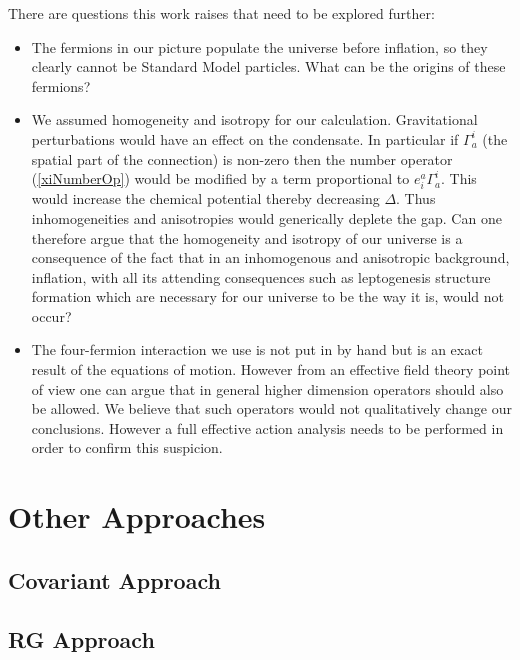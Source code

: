 \begin{doublespace}
There are questions this work raises that need to be explored further:
\begin{itemize}
    \item The fermions in our picture populate the universe before inflation, so they clearly
    cannot be Standard Model particles. What can be the origins of these fermions?
    \item We assumed homogeneity and isotropy for our calculation. Gravitational perturbations
    would have an effect on the condensate. In particular if
$\Gamma^i_a$ (the spatial part of the connection) is non-zero then the number operator
(\ref{xiNumberOp}) would be modified by a term proportional to $e^a_i \Gamma_a^i$. This would
increase the chemical potential thereby decreasing $\Delta$. Thus inhomogeneities and anisotropies
would generically deplete the gap. Can one therefore argue that the homogeneity and isotropy of our
universe is a consequence of the fact that in an inhomogenous and anisotropic background,
inflation, with all its attending consequences such as leptogenesis structure formation which are
necessary for our universe to be the way it is, would not occur?
    \item The four-fermion interaction we use is not put in by hand but is an exact result of the
    equations of motion. However from an effective field theory point of view one can argue that in general
    higher dimension operators should also be allowed. We believe that such operators would not
    qualitatively change our conclusions. However a full effective action analysis needs to be
    performed in order to confirm this suspicion.
\end{itemize}

\section{Other Approaches}

\subsection{Covariant Approach} %

\subsection{RG Approach}  %

\end{doublespace}